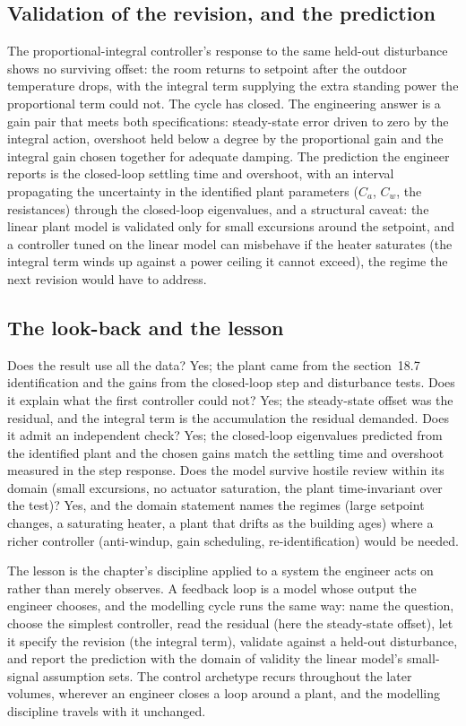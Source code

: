 \subsection{Validation of the revision, and the prediction}

The proportional-integral controller's response to the same held-out
disturbance shows no surviving offset: the room returns to setpoint after
the outdoor temperature drops, with the integral term supplying the extra
standing power the proportional term could not. The cycle has closed. The
engineering answer is a gain pair that meets both specifications:
steady-state error driven to zero by the integral action, overshoot held
below a degree by the proportional gain and the integral gain chosen
together for adequate damping. The prediction the engineer reports is the
closed-loop settling time and overshoot, with an interval propagating the
uncertainty in the identified plant parameters ($C_a$, $C_w$, the
resistances) through the closed-loop eigenvalues, and a structural caveat:
the linear plant model is validated only for small excursions around the
setpoint, and a controller tuned on the linear model can misbehave if the
heater saturates (the integral term winds up against a power ceiling it
cannot exceed), the regime the next revision would have to address.

\subsection{The look-back and the lesson}

Does the result use all the data? Yes; the plant came from the section~18.7
identification and the gains from the closed-loop step and disturbance
tests. Does it explain what the first controller could not? Yes; the
steady-state offset was the residual, and the integral term is the
accumulation the residual demanded. Does it admit an independent check?
Yes; the closed-loop eigenvalues predicted from the identified plant and
the chosen gains match the settling time and overshoot measured in the
step response. Does the model survive hostile review within its domain
(small excursions, no actuator saturation, the plant time-invariant over
the test)? Yes, and the domain statement names the regimes (large setpoint
changes, a saturating heater, a plant that drifts as the building ages)
where a richer controller (anti-windup, gain scheduling, re-identification)
would be needed.

The lesson is the chapter's discipline applied to a system the engineer
acts on rather than merely observes. A feedback loop is a model whose
output the engineer chooses, and the modelling cycle runs the same way:
name the question, choose the simplest controller, read the residual (here
the steady-state offset), let it specify the revision (the integral term),
validate against a held-out disturbance, and report the prediction with the
domain of validity the linear model's small-signal assumption sets. The
control archetype recurs throughout the later volumes, wherever an engineer
closes a loop around a plant, and the modelling discipline travels with it
unchanged.

